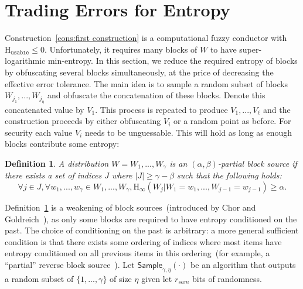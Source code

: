 \documentclass[11pt]{article}
\newcommand{\defref}[1]{\mbox{Definition~\ref{#1}}}
\newcommand{\consref}[1]{\mbox{Construction~\ref{#1}}}
\newcommand{\class}[1]{{\ensuremath{\mathsf{#1}}}}
\newcommand{\sample}{\ensuremath{\class{Sample}}\xspace}
\newcommand{\Hoo}{\mathrm{H}_\infty}
\newcommand{\Huse}{\mathrm{H}_{\mathtt{usable}}}
\newtheorem{definition}[theorem]{Definition}
\newcommand{\authnote}[2]{{\textcolor{red}{\textsf{#1 notes: }\textcolor{blue}{ #2}}\marginpar{\textcolor{red}{\textbf{!!!!!}}}}}
\newcommand{\authnote}[2]{}
\newcommand{\lnote}[1]{{\authnote{Leo}{#1}}}
\begin{document}

\section{Trading Errors for Entropy}
\label{sec:sampling}
\consref{cons:first construction} is a computational fuzzy conductor with $\Huse\le 0$.  Unfortunately, it requires many blocks of $W$ to have super-logarithmic min-entropy.  In this section, we reduce the required entropy of blocks by obfuscating several blocks simultaneously, at the price of  decreasing the effective error tolerance.
The main idea is to sample a random subset of blocks $W_{j_1},..., W_{j_\eta}$ and obfuscate the concatenation of these blocks.  Denote this concatenated value by $V_1$.  This process is repeated to produce $V_1,..., V_\ell$ and the construction proceeds by either obfuscating $V_i$ or a random point as before. For security each value $V_i$ needs to be unguessable.  This will hold as long as enough blocks contribute some entropy:

\begin{definition}
\label{def:partial source}
A distribution $W = W_1,..., W_\gamma$ is an $(\alpha, \beta)$-partial block source if there exists a set of indices $J$ where $|J| \geq \gamma - \beta$ such that the following holds:
\[
\forall j\in J, \forall w_1,..., w_\gamma \in W_1,..., W_\gamma, \Hoo(W_j | W_1 = w_1,..., W_{j-1}=w_{j-1}) \geq \alpha.
\]
\end{definition}
\defref{def:partial source} is a weakening of block sources~(introduced by Chor and Goldreich~\cite{DBLP:journals/siamcomp/ChorG88}), as only some blocks are required to have entropy conditioned on the past.  The choice of conditioning on the past is arbitrary: a more general sufficient condition is that there exists some ordering of indices where most items have entropy conditioned on all previous items in this ordering~(for example, a ``partial'' reverse block source~\cite{vadhan2003constructing}).
Let $\sample_{\gamma, \eta}(\cdot)$ be an algorithm that  outputs a random subset of $\{1,..., \gamma\}$ of size $\eta$ given let $r_{sam}$ bits of randomness.
\end{document}

